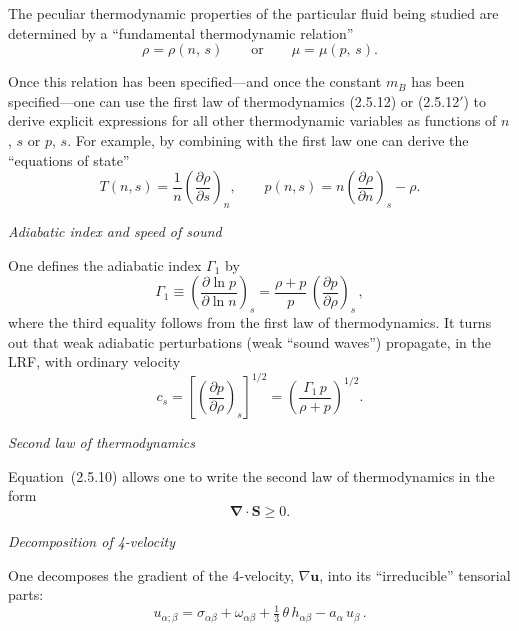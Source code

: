\smallskip
\noindent
The peculiar thermodynamic properties of the particular fluid being
studied are determined by a ``fundamental thermodynamic relation''
%
\begin{equation}
\tag{2.5.13}
\rho = \rho(n,\,s) \qquad \text{or} \qquad
\mu = \mu(p,\,s).
\end{equation}

\noindent
Once this relation has been specified---and once the constant $m_B$ has
been specified---one can use the first law of thermodynamics
(2.5.12) or (2.5.12$'$) to derive explicit expressions
for all other thermodynamic variables as functions of $n$, $s$ or $p$,
$s$.  For example, by combining with the first law one can derive the
``equations of state''
%
\begin{equation}
\tag{2.5.8$'$}
T(n,s) = \frac{1}{n}\left(\frac{\partial\rho}{\partial s}\right)_{\!n},
\qquad
p(n,s) = n\!\left(\frac{\partial\rho}{\partial n}\right)_{\!s} - \rho.
\end{equation}

\bigskip
\noindent
\emph{Adiabatic index and speed of sound}

\smallskip
\noindent
One defines the adiabatic index $\Gamma_1$ by
%
\begin{equation}
\tag{2.5.14}
\Gamma_1
\equiv \left(\frac{\partial\ln p}{\partial\ln n}\right)_{\!s}
= \frac{\rho + p}{p}\,
  \left(\frac{\partial p}{\partial\rho}\right)_{\!s}\,,
\end{equation}
%
where the third equality follows from the first law of thermodynamics.
It turns out that weak adiabatic perturbations (weak ``sound waves'')
propagate, in the LRF, with ordinary velocity
%
\begin{equation}
\tag{2.5.15}
c_s
= \left[\left(\frac{\partial p}{\partial\rho}\right)_{\!s}\right]^{1/2}
= \left(\frac{\Gamma_1\, p}{\rho + p}\right)^{\!1/2}.
\end{equation}

\bigskip
\noindent
\emph{Second law of thermodynamics}

\smallskip
\noindent
Equation~(2.5.10) allows one to write the second law of thermodynamics
in the form
%
\begin{equation}
\tag{2.5.16}
\boldsymbol{\nabla}\cdot\mathbf{S} \geq 0.
\end{equation}

\bigskip
\noindent
\emph{Decomposition of 4-velocity}

\smallskip
\noindent
One decomposes the gradient of the 4-velocity, $\nabla\mathbf{u}$,
into its ``irreducible'' tensorial parts:
%
\begin{equation}
\tag{2.5.17}
u_{\alpha;\beta}
= \sigma_{\alpha\beta} + \omega_{\alpha\beta}
  + \tfrac{1}{3}\,\theta\, h_{\alpha\beta}
  - a_\alpha\, u_\beta\,.
\end{equation}

